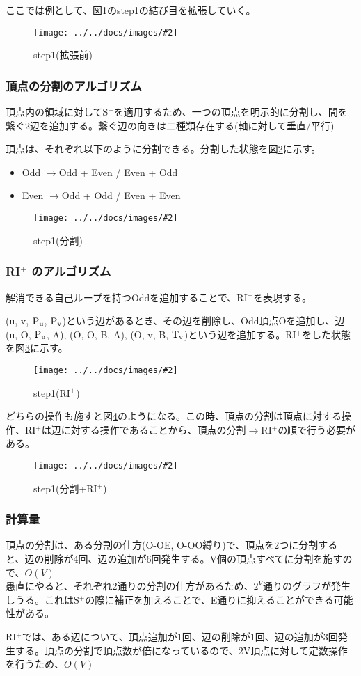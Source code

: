 \documentclass[11pt,a4j]{jarticle}
\newcommand{\splus}{S${}^\text{+}$}
\newcommand{\riplus}{RI${}^\text{+}$}
\newcommand{\f}[1]{$\rm{#1}$} %
\newcommand{\image}[4][height=100pt]{%
\begin{figure}[htbp]
    \centering
    \texttt{[image: ../../docs/images/\#2]}
    \caption{#3}
    \label{fig:#4}
\end{figure}%
}
\newcommand{\ra }{$\rightarrow$}
\newcommand{\tops}[2]{\texorpdfstring{#1}{#2}} %
\begin{document}
ここでは例として、図\ref{fig:default}のstep1の結び目を拡張していく。
\image{extend_default.jpg}{step1(拡張前)}{default}

\subsubsection{頂点の分割のアルゴリズム}
頂点内の領域に対して\splus を適用するため、一つの頂点を明示的に分割し、間を繋ぐ2辺を追加する。繋ぐ辺の向きは二種類存在する(軸に対して垂直/平行)

頂点は、それぞれ以下のように分割できる。分割した状態を図\ref{fig:split}に示す。
\begin{itemize}
    \item Odd \ra  Odd + Even / Even + Odd
    \item Even \ra  Odd + Odd / Even + Even
\end{itemize}

\image{extend_split.jpg}{step1(分割)}{split}

\subsubsection{\tops{\riplus}{RI+} のアルゴリズム}
解消できる自己ループを持つOddを追加することで、\riplus を表現する。

(u, v, \f{P_u}, \f{P_v})という辺があるとき、その辺を削除し、Odd頂点Oを追加し、辺(u, O, \f{P_u}, A), (O, O, B, A), (O, v, B, \f{T_v})という辺を追加する。\riplus をした状態を図\ref{fig:riplus}に示す。

\image{extend_riplus.jpg}{step1(\riplus )}{riplus}

どちらの操作も施すと図\ref{fig:total}のようになる。この時、頂点の分割は頂点に対する操作、\riplus は辺に対する操作であることから、頂点の分割\ra \riplus の順で行う必要がある。
\image{extend_total.jpg}{step1(分割+\riplus )}{total}

\subsubsection{計算量}
頂点の分割は、ある分割の仕方(O-OE, O-OO縛り)で、頂点を2つに分割すると、辺の削除が4回、辺の追加が6回発生する。V個の頂点すべてに分割を施すので、$O(V)$\\
愚直にやると、それぞれ2通りの分割の仕方があるため、$2^V$通りのグラフが発生しうる。これは\splus の際に補正を加えることで、E通りに抑えることができる可能性がある。

\riplus では、ある辺について、頂点追加が1回、辺の削除が1回、辺の追加が3回発生する。頂点の分割で頂点数が倍になっているので、2V頂点に対して定数操作を行うため、$O(V)$
\end{document}
